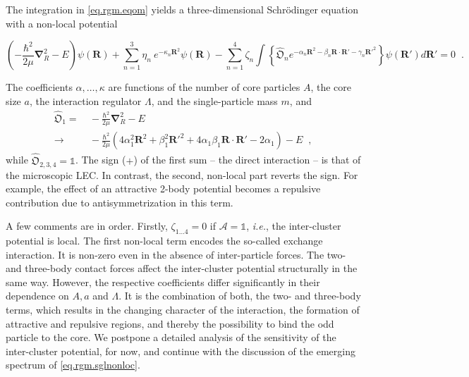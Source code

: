 \documentclass
[aps,nofootinbib,prl,showpacs,twocolumn,groupedaddress,superscriptaddress]
{revtex4}
\newcommand{\la}{\label}
\newcommand{\be}{\begin{equation}}
\newcommand{\ee}{\end{equation}}
\newcommand{\ie}{\textit{i.e.}\;}
\newcommand{\ve}[1]{\ensuremath{\boldsymbol{#1}}}
\begin{document}
The integration in \eqref{eq.rgm.eqom} yields a three-dimensional 
Schr\"odinger equation with a non-local potential
\begin{widetext}
\be\label{eq.rgm.sglnonloc}
\left(-\frac{\hbar^2}{2\mu}\ve{\nabla}_R^2-E\right)\psi(\ve{R})+\sum_{n=1}^3\eta_n~e^{-\kappa_n\ve{R}^2}\psi(\ve{R})-
\sum_{n=1}^4\zeta_n\int\left\lbrace\widehat{\mathfrak{O}}_ne^{-\alpha_n\ve{R}^2-\beta_n\ve{R}\cdot\ve{R}'-\gamma_n\ve{R}'^2}\right\rbrace\psi(\ve{R}') d\ve{R}'=0\;\;.
\ee
\end{widetext}
The coefficients $\alpha,\ldots,\kappa$ are functions of the number of
core particles $A$,
the core size $a$, the interaction regulator $\Lambda$,
and the single-particle mass $m$, and 
\begin{align}\la{eq.exop}
\widehat{\mathfrak{O}}_1=&~-\frac{\hbar^2}{2\mu}\ve{\nabla}_R^2-E\\
\to&~-\frac{\hbar^2}{2\mu}\left(4\alpha_1^2\ve{R}^2+\beta_1^2\ve{R}'^2
+4\alpha_1\beta_1\ve{R}\cdot\ve{R}'-2\alpha_1\right)-E\;\;,\nonumber
\end{align}
while $\widehat{\mathfrak{O}}_{2,3,4}=\mathbb{1}$. The sign ($+$) of the first sum -- the direct
interaction -- is that of the microscopic LEC. In contrast, the second, non-local
part reverts the sign. For example, the effect of an attractive 2-body potential
becomes a repulsive contribution due to antisymmetrization in this term.

A few comments are in order. Firstly, $\zeta_{1\ldots4}=0$ if $\mathcal{A}=\mathbb{1}$, \ie, the
inter-cluster potential is local. The first non-local term encodes the so-called exchange interaction.
It is non-zero even in the absence of inter-particle forces. The two- and three-body
contact forces affect the inter-cluster potential structurally in the same way. However, the respective
coefficients differ significantly in their dependence on $A,a$ and $\Lambda$. It is the combination
of both, the two- and three-body terms, which results in the changing character of the interaction,
the formation of attractive and repulsive regions, and thereby the possibility to bind the odd particle
to the core. We postpone a detailed analysis of the sensitivity of the inter-cluster potential,
for now, and continue with the discussion of the emerging spectrum of \eqref{eq.rgm.sglnonloc}.
\end{document}
